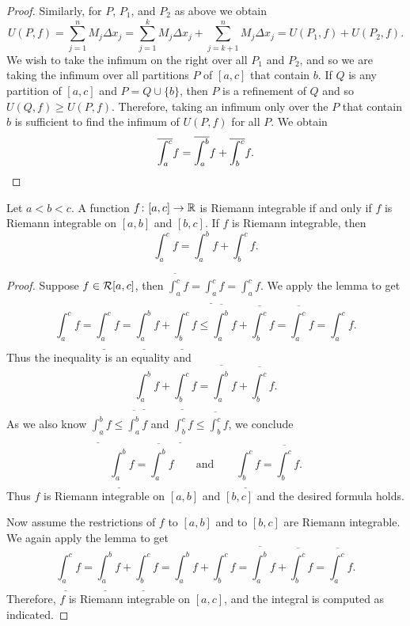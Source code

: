\begin{proof}
Similarly, for $P$, $P_1$, and $P_2$ as above we obtain
\begin{equation*}
U(P,f) =
\sum_{j=1}^n M_j \Delta x_j
=
\sum_{j=1}^k M_j \Delta x_j
+
\sum_{j=k+1}^n M_j \Delta x_j
=
U(P_1,f) + U(P_2,f) .
\end{equation*}
We wish to take the infimum on the right
over all $P_1$ and $P_2$, and so we are taking the infimum
over all partitions $P$ of $[a,c]$ that contain $b$.  If $Q$ is any partition
of $[a,c]$ and $P = Q \cup \{ b \}$, then $P$ is a refinement of $Q$
and so $U(Q,f) \geq U(P,f)$.  Therefore, taking an infimum only over the $P$
that contain $b$ is sufficient to find the infimum of $U(P,f)$ for
all $P$.
We obtain
\begin{equation*}
\overline{\int_a^c} f
=
\overline{\int_a^b} f + \overline{\int_b^c} f .  \qedhere
\end{equation*}
\end{proof}

\begin{prop}
Let $a < b < c$.  A function $f \colon [a,c] \to {\mathbb{R}}$ is Riemann integrable
if and only if $f$ is Riemann integrable on $[a,b]$ and $[b,c]$.  If
$f$ is Riemann integrable, then
\begin{equation*}
\int_a^c f
=
\int_a^b f
+
\int_b^c f .
\end{equation*}
\end{prop}

\begin{proof}
Suppose $f \in {\mathcal{R}}[a,c]$, then 
$\overline{\int_a^c} f = 
\underline{\int_a^c} f = 
\int_a^c f$.  We apply the lemma to get
\begin{equation*}
\int_a^c f
=
\underline{\int_a^c} f
 =
\underline{\int_a^b} f + \underline{\int_b^c} f
 \leq
\overline{\int_a^b} f + \overline{\int_b^c} f
 =
\overline{\int_a^c} f
 =
\int_a^c f .
\end{equation*}
Thus the inequality is an equality and
\begin{equation*}
\underline{\int_a^b} f + \underline{\int_b^c} f
=
\overline{\int_a^b} f + \overline{\int_b^c} f .
\end{equation*}
As we also know 
$\underline{\int_a^b} f \leq \overline{\int_a^b} f$
and
$\underline{\int_b^c} f \leq \overline{\int_b^c} f$, we 
conclude 
\begin{equation*}
\underline{\int_a^b} f
=
\overline{\int_a^b} f
\qquad \text{and} \qquad
\underline{\int_b^c} f
=
\overline{\int_b^c} f .
\end{equation*}
Thus $f$ is Riemann integrable on $[a,b]$ and $[b,c]$ and the desired formula
holds.

Now assume the restrictions of $f$ to $[a,b]$ and to $[b,c]$
are Riemann integrable.  We again apply the lemma to get
\begin{equation*}
\underline{\int_a^c} f
=
\underline{\int_a^b} f + \underline{\int_b^c} f
=
\int_a^b f + \int_b^c f
=
\overline{\int_a^b} f + \overline{\int_b^c} f
=
\overline{\int_a^c} f .
\end{equation*}
Therefore, $f$ is Riemann integrable on $[a,c]$, and the integral is computed
as indicated.
\end{proof}

